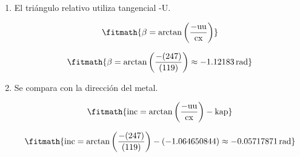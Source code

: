\begin{enumerate}

\item El triángulo relativo utiliza tangencial -U.

\[\fitmath{\beta=\arctan\left(\frac{-\mathrm{uu}}{\mathrm{cx}}\right)}\]

\[\fitmath{\beta=\arctan\left(\frac{-(247)}{(119)}\right)\approx -1.12183\,\mathrm{rad}}\]

\item Se compara con la dirección del metal.

\[\fitmath{\mathrm{inc}=\arctan\left(\frac{-\mathrm{uu}}{\mathrm{cx}}\right)-\mathrm{kap}}\]

\[\fitmath{\mathrm{inc}=\arctan\left(\frac{-(247)}{(119)}\right)-(-1.064650844)\approx -0.05717871\,\mathrm{rad}}\]

\end{enumerate}
